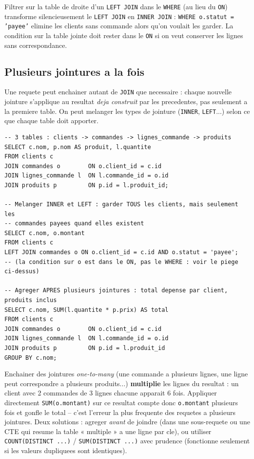 \documentclass[11pt,a4paper]{article}
\begin{document}
\begin{piege}
Filtrer sur la table de droite d'un \texttt{LEFT JOIN} dans le \texttt{WHERE}
(au lieu du \texttt{ON}) transforme silencieusement le \texttt{LEFT JOIN} en
\texttt{INNER JOIN} : \texttt{WHERE o.statut = 'payee'} elimine les clients
sans commande alors qu'on voulait les garder. La condition sur la table jointe
doit rester dans le \texttt{ON} si on veut conserver les lignes sans
correspondance.
\end{piege}

\subsection{Plusieurs jointures a la fois}
Une requete peut enchainer autant de \texttt{JOIN} que necessaire : chaque
nouvelle jointure s'applique au resultat \emph{deja construit} par les
precedentes, pas seulement a la premiere table. On peut melanger les types de
jointure (\texttt{INNER}, \texttt{LEFT}...) selon ce que chaque table doit
apporter.

\begin{lstlisting}
-- 3 tables : clients -> commandes -> lignes_commande -> produits
SELECT c.nom, p.nom AS produit, l.quantite
FROM clients c
JOIN commandes o        ON o.client_id = c.id
JOIN lignes_commande l  ON l.commande_id = o.id
JOIN produits p         ON p.id = l.produit_id;

-- Melanger INNER et LEFT : garder TOUS les clients, mais seulement les
-- commandes payees quand elles existent
SELECT c.nom, o.montant
FROM clients c
LEFT JOIN commandes o ON o.client_id = c.id AND o.statut = 'payee';
-- (la condition sur o est dans le ON, pas le WHERE : voir le piege ci-dessus)

-- Agreger APRES plusieurs jointures : total depense par client, produits inclus
SELECT c.nom, SUM(l.quantite * p.prix) AS total
FROM clients c
JOIN commandes o        ON o.client_id = c.id
JOIN lignes_commande l  ON l.commande_id = o.id
JOIN produits p         ON p.id = l.produit_id
GROUP BY c.nom;
\end{lstlisting}

\begin{piege}
Enchainer des jointures \emph{one-to-many} (une commande a plusieurs lignes,
une ligne peut correspondre a plusieurs produits...) \textbf{multiplie} les
lignes du resultat : un client avec 2 commandes de 3 lignes chacune apparait
6 fois. Appliquer directement \texttt{SUM(o.montant)} sur ce resultat compte
donc \texttt{o.montant} plusieurs fois et gonfle le total -- c'est l'erreur la
plus frequente des requetes a plusieurs jointures. Deux solutions : agreger
\emph{avant} de joindre (dans une sous-requete ou une CTE qui resume la table
« multiple » a une ligne par cle), ou utiliser \texttt{COUNT(DISTINCT ...)} /
\texttt{SUM(DISTINCT ...)} avec prudence (fonctionne seulement si les valeurs
dupliquees sont identiques).
\end{piege}
\end{document}
